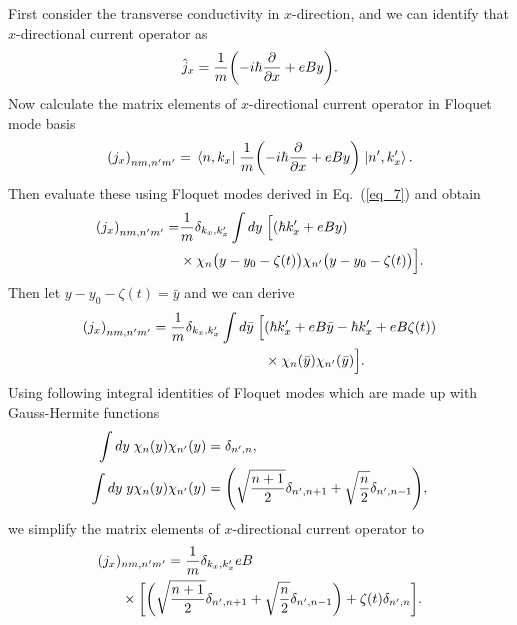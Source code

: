 First consider the transverse conductivity in $x$-direction, and we can identify that $x$-directional current operator as
\begin{equation} \label{eq_d4}
  \hat{j}_x = \frac{1}{m} \qty(-i\hbar\pdv{x} + eBy).
\end{equation}
Now calculate the matrix elements of $x$-directional current operator in Floquet mode basis
\begin{equation} \label{eq_d5}
  \qty({j}_x)_{nm,n'm'} =
  \mel{n,k_x}{\;\frac{1}{m} \qty(-i\hbar\pdv{x} + eBy)\;}{n',k'_x}.
\end{equation}
Then evaluate these using Floquet modes derived in Eq.~(\ref{eq_7}) and obtain
\begin{equation} \label{eq_d6}
  \begin{aligned}
    \qty({j}_x)_{nm,n'm'} = &
    \frac{1}{{m}}
    \delta_{k_x,k'_x}
    \int dy \;
    \Big[
    \qty(\hbar k'_x + eBy) \\
    & \times
     \chi_{n}\big(y - y_0 - \zeta(t)\big)
    \chi_{n'}\big(y - y_0 - \zeta(t)\big)
    \Big].
  \end{aligned}
\end{equation}
Then let $y - y_0 - \zeta(t) = \bar{y}$ and we can derive
\begin{equation} \label{eq_d7}
  \begin{aligned}
    \qty({j}_x)_{nm,n'm'} =
    \frac{1}{{m}}
    \delta_{k_x,k'_x}
    \int d\bar{y} \;
    \Big[ &
    \qty(\hbar k'_x + eB\bar{y} -\hbar k'_x + eB\zeta(t)) \\
    & \times
    \chi_{n}(\bar{y})
    \chi_{n'}(\bar{y})
    \Big].
  \end{aligned}
\end{equation}
Using following integral identities of Floquet modes which are made up with  Gauss-Hermite functions \cite{vedenyapin11,szego59}
\begin{subequations} \label{eq_d8}
  \begin{align}
    \int d{y} \;
    \chi_{n}({y})
    \chi_{n'}({y}) &=
    \delta_{n',n}, \\
    \int dy \;
    y
    \chi_{n}({y})
    \chi_{n'}({y}) &=
    \qty(\sqrt{\frac{n+1}{2}} \delta_{n',n+1} + \sqrt{\frac{n}{2}}
    \delta_{n',n-1}),
  \end{align}
\end{subequations}
we simplify the matrix elements of $x$-directional current operator to
\begin{equation} \label{eq_d9}
  \begin{aligned}
    \qty({j}_x)&_{nm,n'm'} =
    \frac{1}{{m}}
    \delta_{k_x,k'_x}
    eB\\
    & \times
    \bigg[
    \bigg(\sqrt{\frac{n+1}{2}} \delta_{n',n+1} + \sqrt{\frac{n}{2}}
    \delta_{n',n-1}\bigg)
    + \zeta(t) \delta_{n',n}
    \bigg].
  \end{aligned}
\end{equation}


